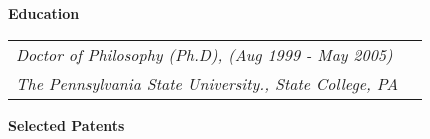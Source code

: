 \documentclass{article}
\begin{document}
\vspace*{-0.1truein}
  \large \textbf{Education}
\vspace*{-0.1truein}

  \begin{center}
	\normalsize
	\begin{tabularx}{6.2in}{Xr}
        \emph{Doctor of Philosophy (Ph.D), (Aug 1999 - May 2005) } & \\
	\emph{The Pennsylvania State University., State College, PA} & \\
	\end{tabularx}

  \end{center}


\vspace*{-0.1truein}
\large \textbf{Selected Patents}
  \small
\vspace*{-0.2truein}
\end{document}
